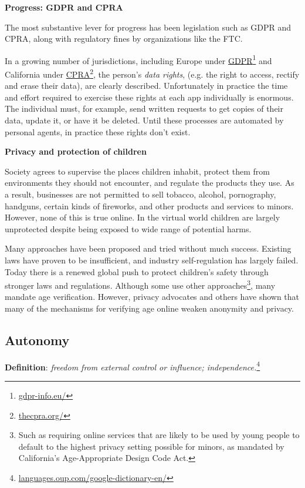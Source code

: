 \documentclass[11pt, oneside]{article}   	%
\newcommand{\hyperfootnote}[1][]{\def\ArgI{{#1}}\hyperfootnoteRelay}
\newcommand\hyperfootnoteRelay[2][]{\href{#1#2}{\ArgI}\footnote{\href{#1#2}{#2}}}
\begin{document}
\textbf{Progress: GDPR and CPRA}

The most substantive lever for progress has been legislation such as GDPR and CPRA, along with regulatory fines by organizations like the FTC. 

In a growing number of jurisdictions, including Europe under \hyperfootnote[GDPR][https://]{gdpr-info.eu/} and California under \hyperfootnote[CPRA][https://]{thecpra.org/}, the person's \emph{data rights}, (e.g. the right to access, rectify and erase their data), are clearly described. Unfortunately in practice the time and effort required to exercise these rights at each app individually is enormous. The individual must, for example, send written requests to get copies of their data, update it, or have it be deleted. Until these processes are automated by personal agents, in practice these rights don't exist.

\textbf{Privacy and protection of children}

Society agrees to supervise the places children inhabit, protect them from environments they should not encounter, and regulate the products they use. As a result, businesses are not permitted to sell tobacco, alcohol, pornography, handguns, certain kinds of fireworks, and other products and services to minors. However, none of this is true online. In the virtual world children are largely unprotected despite being exposed to wide range of potential harms. 

Many approaches have been proposed and tried without much success. Existing laws have proven to be insufficient, and industry self-regulation has largely failed. Today there is a renewed global push to protect children's safety through stronger laws and regulations. Although some use other approaches\footnote{Such as requiring online services that are likely to be used by young people to default to the highest privacy setting possible for minors, as mandated by California's Age-Appropriate Design Code Act.}, many mandate age verification.\cite{Griswold2023}\cite{Jackson2023} However, privacy advocates and others have shown that many of the mechanisms for verifying age online weaken anonymity and privacy.\cite{Roth2023}

\subsection{Autonomy}

\textbf{Definition}: \emph{freedom from external control or influence; independence.}\hyperfootnote[][https://]{languages.oup.com/google-dictionary-en/}
\end{document}
